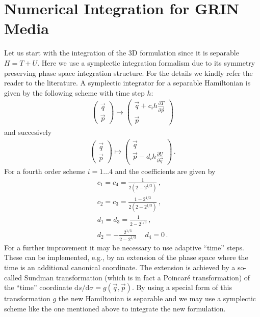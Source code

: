 \documentclass[12pt,a4paper,twoside,openright,BCOR10mm,headsepline,titlepage,abstracton,chapterprefix,final]{scrreprt}
\begin{document}
\section{Numerical Integration for GRIN Media}
Let us start with the integration of the 3D formulation since it is separable $H = T + U$. Here we use a symplectic integration formalism
due to its symmetry preserving phase space integration structure. For the details we kindly refer the reader to the
literature. A symplectic integrator for a separable Hamiltonian is given by the following scheme with time step $h$:
\begin{align}
 \begin{pmatrix}
  \vec{q} \\
  \vec{p}
 \end{pmatrix} \mapsto
 \begin{pmatrix}
  \vec{q} + c_i h \frac{\partial T}{\partial \vec{p}} \\
  \vec{p}
 \end{pmatrix}
\end{align}
and succesively
\begin{align}
 \begin{pmatrix}
  \vec{q} \\
  \vec{p}
 \end{pmatrix} \mapsto
 \begin{pmatrix}
  \vec{q} \\
  \vec{p} - d_i h \frac{\partial U}{\partial \vec{q}}
 \end{pmatrix}\,.
\end{align}
For a fourth order scheme $i=1\dots4$ and the coefficients are given by
\begin{align}
 c_1 = c_4 = \frac{1}{2(2 - 2^{1/3})}\,,\\
 c_2 = c_3 = \frac{1 - 2^{1/3}}{2(2 - 2^{1/3})}\,,\\
 d_1 = d_3 = \frac{1}{2 - 2^{1/3}}\,,\\
 d_2 = -\frac{2^{1/3}}{2 - 2^{1/3}}\,\quad d_4 = 0\,.
\end{align}
For a further improvement it may be necessary to use adaptive ``time'' steps.
These can be implemented, e.g., by an extension of the phase space where
the time is an additional canonical coordinate. The extension is achieved by
a so-called Sundman transformation (which is in fact a Poincar{\'e} transformation)
of the ``time'' coordinate
$\text{d}s/\text{d}\sigma = g(\vec{q}, \vec{p})$.
By using a special form of this transformation $g$ the new Hamiltonian is separable and we
may use a symplectic scheme like the one mentioned above to integrate the new formulation.
\end{document}

